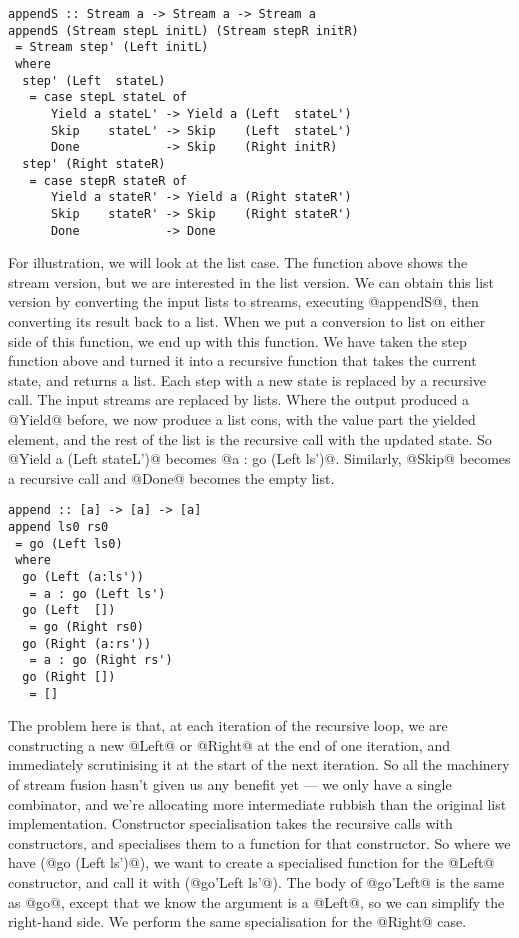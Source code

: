 \begin{lstlisting}
appendS :: Stream a -> Stream a -> Stream a
appendS (Stream stepL initL) (Stream stepR initR)
 = Stream step' (Left initL)
 where
  step' (Left  stateL)
   = case stepL stateL of
      Yield a stateL' -> Yield a (Left  stateL')
      Skip    stateL' -> Skip    (Left  stateL')
      Done            -> Skip    (Right initR)
  step' (Right stateR)
   = case stepR stateR of
      Yield a stateR' -> Yield a (Right stateR')
      Skip    stateR' -> Skip    (Right stateR')
      Done            -> Done
\end{lstlisting}

For illustration, we will look at the list case. The function above shows the stream version, but we are interested in the list version.
We can obtain this list version by converting the input lists to streams, executing @appendS@, then converting its result back to a list.
When we put a conversion to list on either side of this function, we end up with this function.
We have taken the step function above and turned it into a recursive function that takes the current state, and returns a list.
Each step with a new state is replaced by a recursive call.
The input streams are replaced by lists.
Where the output produced a @Yield@ before, we now produce a list cons, with the value part the yielded element, and the rest of the list is the recursive call with the updated state.
So @Yield a (Left stateL')@ becomes @a : go (Left ls')@.
Similarly, @Skip@ becomes a recursive call and @Done@ becomes the empty list.


\begin{lstlisting}
append :: [a] -> [a] -> [a]
append ls0 rs0
 = go (Left ls0)
 where
  go (Left (a:ls'))
   = a : go (Left ls')
  go (Left  [])
   = go (Right rs0)
  go (Right (a:rs'))
   = a : go (Right rs')
  go (Right [])
   = []
\end{lstlisting}

The problem here is that, at each iteration of the recursive loop, we are constructing a new @Left@ or @Right@ at the end of one iteration, and immediately scrutinising it at the start of the next iteration.
So all the machinery of stream fusion hasn't given us any benefit yet --- we only have a single combinator, and we're allocating more intermediate rubbish than the original list implementation.
Constructor specialisation takes the recursive calls with constructors, and specialises them to a function for that constructor.
So where we have (@go (Left ls')@), we want to create a specialised function for the @Left@ constructor, and call it with (@go'Left ls'@).
The body of @go'Left@ is the same as @go@, except that we know the argument is a @Left@, so we can simplify the right-hand side.
We perform the same specialisation for the @Right@ case.

